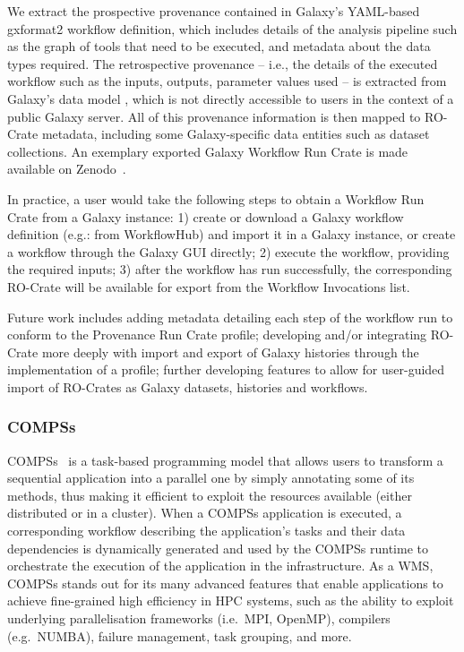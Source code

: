 We extract the prospective provenance contained in Galaxy's YAML-based gxformat2
 workflow definition, which includes details of the analysis pipeline such as the graph of tools that need to be executed, and metadata about the data types required.
The retrospective provenance -- i.e., the details of the executed workflow such as the inputs, outputs, parameter values used -- is extracted from Galaxy's data model , which is not directly accessible to users in the context of a public Galaxy server.
All of this provenance information is then mapped to RO-Crate metadata, including some Galaxy-specific data entities such as dataset collections.
An exemplary exported Galaxy Workflow Run Crate is made available on Zenodo~\cite{De Geest 2023}.

In practice, a user would take the following steps to obtain a Workflow Run Crate from a Galaxy instance: 1) create or download a Galaxy workflow definition (e.g.: from WorkflowHub) and import it in a Galaxy instance, or create a workflow through the Galaxy GUI directly; 2) execute the workflow, providing the required inputs; 3) after the workflow has run successfully, the corresponding RO-Crate will be available for export from the Workflow Invocations list.

Future work includes adding metadata detailing each step of the workflow run to conform to the Provenance Run Crate profile; developing and/or integrating RO-Crate more deeply with import and export of Galaxy histories through the implementation of a profile; further developing features to allow for user-guided import of RO-Crates as Galaxy datasets, histories and workflows.

\subsubsection{COMPSs}\label{ch54:compss}

COMPSs~\cite{Lordan 2014} is a task-based programming model that allows users to transform a sequential application into a parallel one by simply annotating some of its methods, thus making it efficient to exploit the resources available (either distributed or in a cluster).
When a COMPSs application is executed, a corresponding workflow describing the application's tasks and their data dependencies is dynamically generated and used by the COMPSs runtime to orchestrate the execution of the application in the infrastructure.
As a WMS, COMPSs stands out for its many advanced features that enable applications to achieve fine-grained high efficiency in HPC systems, such as the ability to exploit underlying parallelisation frameworks (i.e.~MPI, OpenMP), compilers (e.g.~NUMBA), failure management, task grouping, and more.

